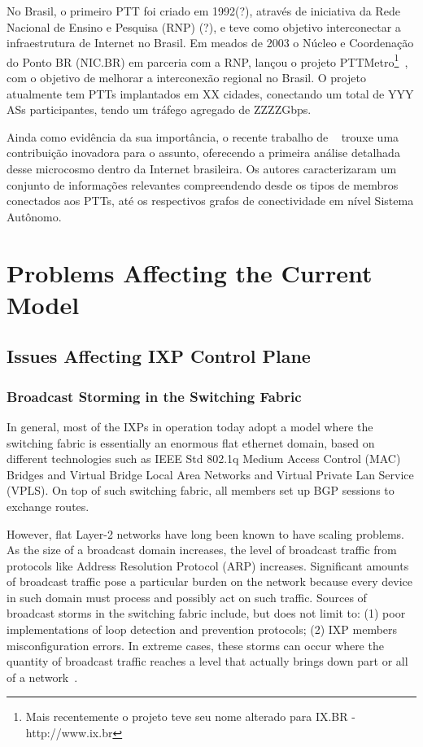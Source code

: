 No Brasil, o primeiro PTT foi criado em 1992(?), através de iniciativa da Rede Nacional de Ensino e Pesquisa (RNP) (?), e teve como objetivo interconectar a infraestrutura de Internet no Brasil. Em meados de 2003 o Núcleo e Coordenação do Ponto BR (NIC.BR) em parceria com a RNP, lançou o projeto PTTMetro\footnote{Mais recentemente o projeto teve seu nome alterado para IX.BR - http://www.ix.br}~\cite{pttmetro}, com o objetivo de melhorar a interconexão regional no Brasil. O projeto atualmente tem PTTs implantados em XX cidades, conectando um total de YYY ASs participantes, tendo um tráfego agregado de ZZZZGbps.

Ainda como evidência da sua importância, o recente trabalho de ~\cite{brito2015anatomia} trouxe uma contribuição inovadora para o assunto, oferecendo a primeira análise detalhada desse microcosmo dentro da Internet brasileira. Os autores caracterizaram um conjunto de informações relevantes compreendendo desde os tipos de membros conectados aos PTTs, até os respectivos grafos de conectividade em nível Sistema Autônomo.

\section{Problems Affecting the Current Model}
\subsection{Issues Affecting IXP Control Plane}
\label{subsec:issues_cp}

\subsubsection{Broadcast Storming in the Switching Fabric}
\label{subsubsec:broadcast_storm}
In general, most of the IXPs in operation today adopt a model where the switching fabric is essentially an enormous flat ethernet domain, based on different technologies such as IEEE Std 802.1q Medium Access Control (MAC) Bridges and Virtual Bridge Local Area Networks and Virtual Private Lan Service (VPLS). On top of such switching fabric, all members set up BGP sessions to exchange routes.

However, flat Layer-2 networks have long been known to have scaling problems. As the size of a broadcast domain increases, the level of broadcast traffic from protocols like Address Resolution Protocol (ARP) increases. Significant amounts of broadcast traffic pose a particular burden on the network because every device in such domain must process and possibly act on such traffic. Sources of broadcast storms in the switching fabric include, but does not limit to: (1) poor implementations of loop detection and prevention protocols; (2) IXP members misconfiguration errors. In extreme cases, these storms can occur where the quantity of broadcast traffic reaches a level that actually brings down part or all of a network~\cite{rfc6820}. 


